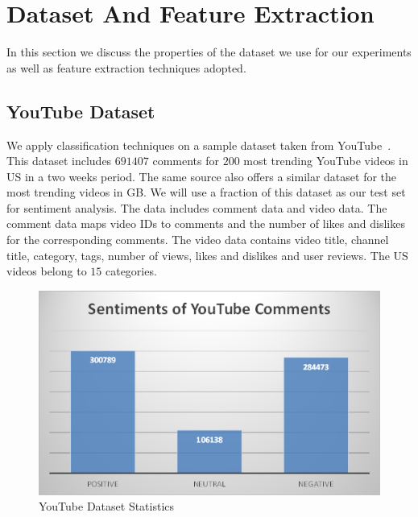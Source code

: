 \section{Dataset And Feature Extraction}
\label{sec:data}
In this section we discuss the properties of the dataset we use for our experiments as well as feature extraction techniques adopted.

\subsection{YouTube Dataset}
\label{sec:youtubedataset}
We apply classification techniques on a sample dataset taken from YouTube~\cite{youtubedata}. 
This dataset includes $691407$ comments for $200$ most trending YouTube videos in US in a two weeks period. 
The same source also offers a similar dataset for the most trending videos in GB. 
We will use a fraction of this dataset as our test set for sentiment analysis. 
The data includes comment data and video data. The comment data maps video IDs to comments and the number of likes and dislikes for the corresponding comments. The video data contains video title, channel title, category, tags, number of views, likes and dislikes and user reviews. The US videos belong to $15$ categories.

\begin{figure}%
\centering
\includegraphics[width=1.0\columnwidth]{figures/datastats.png}%
\caption{YouTube Dataset Statistics}%
\label{fig:datastats}%
\end{figure}

